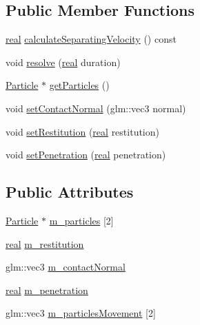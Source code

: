 \subsection*{Public Member Functions}
\begin{DoxyCompactItemize}
\item 
\hyperlink{namespacerum_a7e8cca23573d5eaead0f138cbaa4862c}{real} \hyperlink{classrum_1_1_particle_contact_a85e06dde6b23622bf8d9f6a99205fcfc}{calculate\+Separating\+Velocity} () const
\item 
void \hyperlink{classrum_1_1_particle_contact_acf090d7537e78bea0e9008b55a3959c9}{resolve} (\hyperlink{namespacerum_a7e8cca23573d5eaead0f138cbaa4862c}{real} duration)
\item 
\hyperlink{classrum_1_1_particle}{Particle} $\ast$ \hyperlink{classrum_1_1_particle_contact_a3cccc345ae55939b5fca963e86d7deae}{get\+Particles} ()
\item 
void \hyperlink{classrum_1_1_particle_contact_a0626aa815eab861f15cc9dfc582452a6}{set\+Contact\+Normal} (glm\+::vec3 normal)
\item 
void \hyperlink{classrum_1_1_particle_contact_abf356cecb0c3c42d889a561afc901a97}{set\+Restitution} (\hyperlink{namespacerum_a7e8cca23573d5eaead0f138cbaa4862c}{real} restitution)
\item 
void \hyperlink{classrum_1_1_particle_contact_ab31f404b4e571262ade5c9d8b1f36f97}{set\+Penetration} (\hyperlink{namespacerum_a7e8cca23573d5eaead0f138cbaa4862c}{real} penetration)
\end{DoxyCompactItemize}
\subsection*{Public Attributes}
\begin{DoxyCompactItemize}
\item 
\hyperlink{classrum_1_1_particle}{Particle} $\ast$ \hyperlink{classrum_1_1_particle_contact_a01267c3d6f9227b318a7b49182d01006}{m\+\_\+particles} \mbox{[}2\mbox{]}
\item 
\hyperlink{namespacerum_a7e8cca23573d5eaead0f138cbaa4862c}{real} \hyperlink{classrum_1_1_particle_contact_a0be16bc823ae27866228345eb3349482}{m\+\_\+restitution}
\item 
glm\+::vec3 \hyperlink{classrum_1_1_particle_contact_a8b0d26e0c773a739f34eb27d7e8d9c17}{m\+\_\+contact\+Normal}
\item 
\hyperlink{namespacerum_a7e8cca23573d5eaead0f138cbaa4862c}{real} \hyperlink{classrum_1_1_particle_contact_a935966849508ec47d3c6330816f873de}{m\+\_\+penetration}
\item 
glm\+::vec3 \hyperlink{classrum_1_1_particle_contact_ab03921d708387e5bbc3a0c01f1f5a3da}{m\+\_\+particles\+Movement} \mbox{[}2\mbox{]}
\end{DoxyCompactItemize}
